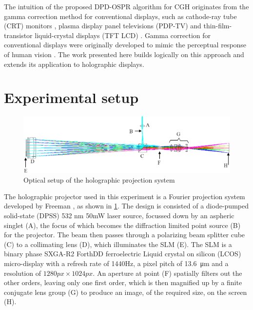 The intuition of the proposed DPD-OSPR algorithm for CGH originates from the gamma correction method for conventional displays, such as cathode-ray tube (CRT) monitors \cite{Xu2009}, plasma display panel televisions (PDP-TV) \cite{Sung2009} and thin-film-transistor liquid-crystal displays (TFT LCD) \cite{Lee2005,Prraga2014}. Gamma correction for conventional displays were originally developed to mimic the perceptual response of human vision \cite{Poynton2012}. The work presented here builds logically on this approach and extends its application to holographic displays.




\section{Experimental setup} \label{sec:experimental setup}

\begin{figure}[H]
    \centering
    \includegraphics[width=\textwidth]{projection_setup.png}
    \caption{Optical setup of the holographic projection system \cite{Freeman2009}}
    \label{fig:projection_setup}
\end{figure}

The holographic projector used in this experiment is a Fourier projection system developed by Freeman \cite{Freeman2009}, as shown in \cref{fig:projection_setup}. The design is consisted of a diode-pumped solid-state (DPSS) 532 nm 50mW laser source, focussed down by an aspheric singlet (A), the focus of which becomes the diffraction limited point source (B) for the projector. The beam then passes through a polarizing beam splitter cube (C) to a collimating lens (D), which illuminates the SLM (E). The SLM is a binary phase SXGA-R2 ForthDD ferroelectric Liquid crystal on silicon (LCOS) micro-display with a refresh rate of 1440Hz, a pixel pitch of \SI{13.6}{\micro\metre} and a resolution of $1280px \times 1024px$. An aperture at point (F) spatially filters out the other orders, leaving only one first order, which is then magnified up by a finite conjugate lens group (G) to produce an image, of the required size, on the screen (H). \cite{Freeman2009}

